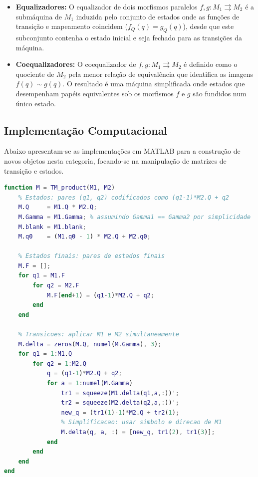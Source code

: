 \begin{itemize}
    \item \textbf{Equalizadores:} O equalizador de dois morfismos paralelos $f, g: M_1 \rightrightarrows M_2$ é a submáquina de $M_1$ induzida pelo conjunto de estados onde as funções de transição e mapeamento coincidem ($f_Q(q) = g_Q(q)$), desde que este subconjunto contenha o estado inicial e seja fechado para as transições da máquina.

    \item \textbf{Coequalizadores:} O coequalizador de $f, g: M_1 \rightrightarrows M_2$ é definido como o quociente de $M_2$ pela menor relação de equivalência que identifica as imagens $f(q) \sim g(q)$. O resultado é uma máquina simplificada onde estados que desempenham papéis equivalentes sob os morfismos $f$ e $g$ são fundidos num único estado.
\end{itemize}

\subsection{Implementação Computacional}

Abaixo apresentam-se as implementações em MATLAB para a construção de novos objetos nesta categoria, focando-se na manipulação de matrizes de transição e estados.

\begin{lstlisting}[language=Matlab, caption={Produto de duas Máquinas de Turing}]
function M = TM_product(M1, M2)
    % Estados: pares (q1, q2) codificados como (q1-1)*M2.Q + q2
    M.Q     = M1.Q * M2.Q;
    M.Gamma = M1.Gamma; % assumindo Gamma1 == Gamma2 por simplicidade
    M.blank = M1.blank;
    M.q0    = (M1.q0 - 1) * M2.Q + M2.q0;
    
    % Estados finais: pares de estados finais
    M.F = [];
    for q1 = M1.F
        for q2 = M2.F
            M.F(end+1) = (q1-1)*M2.Q + q2;
        end
    end
    
    % Transicoes: aplicar M1 e M2 simultaneamente
    M.delta = zeros(M.Q, numel(M.Gamma), 3);
    for q1 = 1:M1.Q
        for q2 = 1:M2.Q
            q = (q1-1)*M2.Q + q2;
            for a = 1:numel(M.Gamma)
                tr1 = squeeze(M1.delta(q1,a,:))';
                tr2 = squeeze(M2.delta(q2,a,:))';
                new_q = (tr1(1)-1)*M2.Q + tr2(1);
                % Simplificacao: usar simbolo e direcao de M1
                M.delta(q, a, :) = [new_q, tr1(2), tr1(3)];
            end
        end
    end
end
\end{lstlisting}